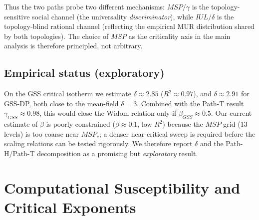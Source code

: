 \documentclass[11pt]{article}
\begin{document}
Thus the two paths probe two different mechanisms: $MSP/\gamma$ is the topology-sensitive social channel (the universality \emph{discriminator}), while $IUL/\delta$ is the topology-blind rational channel (reflecting the empirical MUR distribution shared by both topologies). The choice of $MSP$ as the criticality axis in the main analysis is therefore principled, not arbitrary.

\subsection{Empirical status (exploratory)}
On the GSS critical isotherm we estimate $\delta \approx 2.85$ ($R^2\approx 0.97$), and $\delta \approx 2.91$ for GSS-DP, both close to the mean-field $\delta=3$. Combined with the Path-T result $\gamma_{GSS}\approx 0.98$, this would close the Widom relation only if $\beta_{GSS}\approx 0.5$. Our current estimate of $\beta$ is poorly constrained ($\beta \approx 0.1$, low $R^2$) because the $MSP$ grid (13 levels) is too coarse near $MSP_c$; a denser near-critical sweep is required before the scaling relations can be tested rigorously. We therefore report $\delta$ and the Path-H/Path-T decomposition as a promising but \emph{exploratory} result.

\section{Computational Susceptibility and Critical Exponents}
\end{document}
